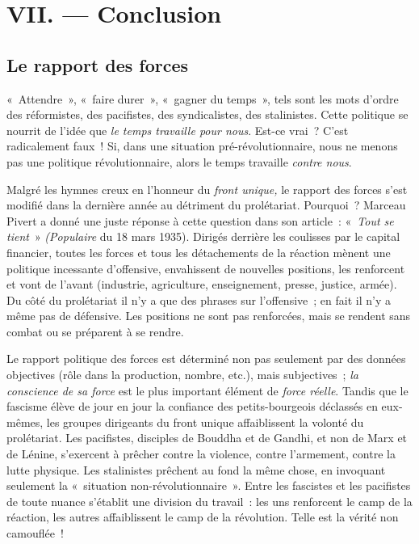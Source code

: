 \documentclass[french,twoside]{book} %
\begin{document}
\section[{VII. — Conclusion}]{VII. — Conclusion}
\subsection[{Le rapport des forces}]{Le rapport des forces}
\noindent « Attendre », « faire durer », « gagner du temps », tels sont les mots d’ordre des réformistes, des pacifistes, des syndicalistes, des stalinistes. Cette politique se nourrit de l’idée que \emph{le temps travaille pour nous}. Est-ce vrai ? C’est radicalement faux ! Si, dans une situation pré-révolutionnaire, nous ne menons pas une politique révolutionnaire, alors le temps travaille \emph{contre nous}.\par
Malgré les hymnes creux en l’honneur du \emph{front unique, }le rapport des forces s’est modifié dans la dernière année au détriment du prolétariat. Pourquoi ? Marceau Pivert a donné une juste réponse à cette question dans son article : « \emph{Tout se tient} » \emph{(Populaire} du 18 mars 1935). Dirigés derrière les coulisses par le capital financier, toutes les forces et tous les détachements de la réaction mènent une politique incessante d’offensive, envahissent de nouvelles positions, les renforcent et vont de l’avant (industrie, agriculture, enseignement, presse, justice, armée). Du côté du prolétariat il n’y a que des phrases sur l’offensive ; en fait il n’y a même pas de défensive. Les positions ne sont pas renforcées, mais se rendent sans combat ou se préparent à se rendre.\par
Le rapport politique des forces est déterminé non pas seulement par des données objectives (rôle dans la production, nombre, etc.), mais subjectives ; \emph{la conscience de sa  force} est le plus important élément de \emph{force réelle}. Tandis que le fascisme élève de jour en jour la confiance des petits-bourgeois déclassés en eux-mêmes, les groupes dirigeants du front unique affaiblissent la volonté du prolétariat. Les pacifistes, disciples de Bouddha et de Gandhi, et non de Marx et de Lénine, s’exercent à prêcher contre la violence, contre l’armement, contre la lutte physique. Les stalinistes prêchent au fond la même chose, en invoquant seulement la « situation non-révolutionnaire ». Entre les fascistes et les pacifistes de toute nuance s’établit une division du travail : les uns renforcent le camp de la réaction, les autres affaiblissent le camp de la révolution. Telle est la vérité non camouflée !
\end{document}
